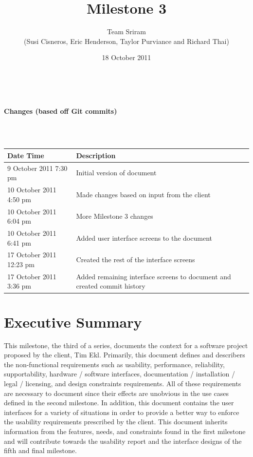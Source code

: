 \documentclass{article}
\begin{document}
\setlength{\voffset}{3.5in}
\title{Milestone 3}
\author{Team Sriram\\
(Susi Cisneros, Eric Henderson, Taylor Purviance and Richard Thai)}
\date{18 October 2011}
\maketitle
\clearpage
\setlength{\voffset}{0pt}
\tableofcontents
\clearpage
~\\
\begin{Large}\textbf{Changes (based off Git commits)}\end{Large}\\
~\\
\begin{tabular}{ | p{2in} | p{4.5in} | }
\hline
\textbf{Date Time} & \textbf{Description}\\
\hline
\hline
9 October 2011 7:30 pm & Initial version of document\\
\hline
10 October 2011 4:50 pm & Made changes based on input from the client\\
\hline
10 October 2011 6:04 pm & More Milestone 3 changes\\
\hline
10 October 2011 6:41 pm & Added user interface screens to the document\\
\hline
17 October 2011 12:23 pm & Created the rest of the interface screens\\
\hline
17 October 2011 3:36 pm & Added remaining interface screens to document and created commit history\\
\hline
\end{tabular}
\clearpage

\section{Executive Summary}
This milestone, the third of a series, documents the context for a software project proposed by the client, Tim Ekl.  Primarily, this document defines and describers the non-functional requirements such as usability, performance, reliability, supportability, hardware / software interfaces, documentation / installation / legal / licensing, and design constraints requirements.  All of  these requirements are necessary to document since their effects are unobvious in the use cases defined in the second milestone.  In addition, this document contains the user interfaces for a variety of situations in order to provide a better way to enforce the usability requirements prescribed by the client.  This document inherits information from the features, needs, and constraints found in the first milestone and will contribute towards the usability report and the interface designs of the fifth and final milestone.\label{interface}
\end{document}
